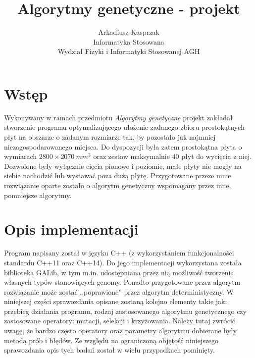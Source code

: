 \documentclass[11pt,a4paper,oneside]{article}
\title{Algorytmy genetyczne - projekt} %
\author{Arkadiusz Kasprzak\\Informatyka Stosowana\\Wydział Fizyki i Informatyki Stosowanej AGH} %
\date{}
\begin{document}
\maketitle

\tableofcontents
\newpage

\pagestyle{fancy}
\fancyhf{}

\cfoot{\thepage}

\section{Wstęp}
Wykonywany w ramach przedmiotu \textit{Algorytmy genetyczne} projekt zakładał stworzenie programu optymalizującego ułożenie zadanego zbioru prostokątnych płyt na obszarze o zadanym rozmiarze tak, by pozostało jak najmniej niezagospodarowanego miejsca. Do dyspozycji była zatem prostokątna płyta o wymiarach $2800 \times 2070~\si{mm^2}$ oraz zestaw maksymalnie 40 płyt do wycięcia z niej. Dozwolone były wyłącznie cięcia pionowe i poziomie, małe płyty nie mogły na siebie nachodzić lub wystawać poza dużą płytę. Przygotowane przeze mnie rozwiązanie oparte zostało o algorytm genetyczny wspomagany przez inne, pomniejsze algorytmy.

\section{Opis implementacji}
Program napisany został w języku C++ (z wykorzystaniem funkcjonalności standardu C++11 oraz C++14). Do jego implementacji wykorzystana została biblioteka GALib, w tym m.in. udostępniana przez nią możliwość tworzenia własnych typów stanowiących genomy. Ponadto przygotowane przez algorytm rozwiązanie może zostać ,,poprawione'' przez algorytm deterministyczny. W niniejszej części sprawozdania opisane zostaną kolejno elementy takie jak: przebieg działania programu, rodzaj zastosowanego algorytmu genetycznego czy zastosowane operatory: mutacji, selekcji i krzyżowania. Należy tutaj zwrócić uwagę, że bardzo często operatory oraz parametry algorytmu dobierane były metodą prób i błędów. Ze względu na ograniczoną objętość niniejszego sprawozdania opis tych badań został w wielu przypadkach pominięty.
\end{document}

